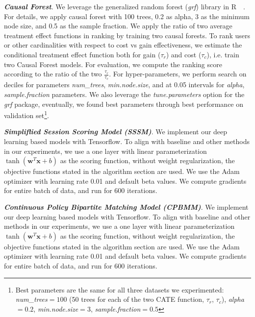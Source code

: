 \documentclass{article}
\begin{document}
\emph{\textbf{Causal Forest}}. We leverage the generalized random forest (\emph{grf}) library in R~\cite{wager2018estimation}~\cite{grflink}. For details, we apply causal forest with 100 trees, 0.2 as alpha, 3 as the minimum node size, and 0.5 as the sample fraction. We apply the ratio of two average treatment effect functions in ranking by training two causal forests. To rank users or other cardinalities with respect to cost vs gain effectiveness, we estimate the conditional treatment effect function both for gain ($\tau_r$) and cost ($\tau_c$), i.e. train two Causal Forest models. For evaluation, we compute the ranking score according to the ratio of the two $\frac{\tau_r}{\tau_c}$. 
For hyper-parameters, we perform search on deciles for parameters \emph{num\_trees}, \emph{min.node.size}, and at 0.05 intervals for \emph{alpha}, \emph{sample.fraction} parameters. We also leverage the \emph{tune.parameters} option for the \emph{grf} package, eventually, we found best parameters through best performance on validation set\footnote{Best parameters are the same for all three datasets we experimented: \emph{num\_trees}$=100$ (50 trees for each of the two CATE function, $\tau_r$, $\tau_c$), \emph{alpha}$=0.2$, \emph{min.node.size}$=3$, \emph{sample.fraction}$=0.5$}. 

\emph{\textbf{Simpliflied Session Scoring Model (SSSM)}}. We implement our deep learning based models with Tensorflow. To align with baseline and other methods in our experiments, we use a one layer with linear parameterization $\tanh(\mathbf{w}^T \mathbf{x} + b)$ as the scoring function, without weight regularization, the objective functions stated in the algorithm section are used. We use the Adam optimizer with learning rate 0.01 and default beta values. We compute gradients for entire batch of data, and run for 600 iterations. 

\emph{\textbf{Continuous Policy Bipartite Matching Model (CPBMM)}}. We implement our deep learning based models with Tensorflow. To align with baseline and other methods in our experiments, we use a one layer with linear parameterization $\tanh(\mathbf{w}^T \mathbf{x} + b)$ as the scoring function, without weight regularization, the objective functions stated in the algorithm section are used. We use the Adam optimizer with learning rate 0.01 and default beta values. We compute gradients for entire batch of data, and run for 600 iterations. 
\end{document}
